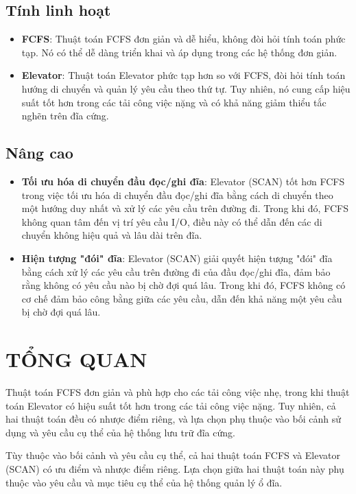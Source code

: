 \documentclass{report}
\begin{document}
        \subsection{Tính linh hoạt}
            \begin{itemize}
                \item \textbf{FCFS}: Thuật toán FCFS đơn giản và dễ hiểu, không đòi hỏi tính toán phức tạp. Nó có thể dễ dàng triển khai và áp dụng trong các hệ thống đơn giản.

                \item \textbf{Elevator}: Thuật toán Elevator phức tạp hơn so với FCFS, đòi hỏi tính toán hướng di chuyển và quản lý yêu cầu theo thứ tự. Tuy nhiên, nó cung cấp hiệu suất tốt hơn trong các tải công việc nặng và có khả năng giảm thiểu tắc nghẽn trên đĩa cứng.

            \end{itemize}

        \subsection{Nâng cao}
            \begin{itemize}
                \item \textbf{Tối ưu hóa di chuyển đầu đọc/ghi đĩa}: Elevator (SCAN) tốt hơn FCFS trong việc tối ưu hóa di chuyển đầu đọc/ghi đĩa bằng cách di chuyển theo một hướng duy nhất và xử lý các yêu cầu trên đường đi. Trong khi đó, FCFS không quan tâm đến vị trí yêu cầu I/O, điều này có thể dẫn đến các di chuyển không hiệu quả và lâu dài trên đĩa.

                \item \textbf{Hiện tượng "đói" đĩa}: Elevator (SCAN) giải quyết hiện tượng "đói" đĩa bằng cách xử lý các yêu cầu trên đường đi của đầu đọc/ghi đĩa, đảm bảo rằng không có yêu cầu nào bị chờ đợi quá lâu. Trong khi đó, FCFS không có cơ chế đảm bảo công bằng giữa các yêu cầu, dẫn đến khả năng một yêu cầu bị chờ đợi quá lâu.
            \end{itemize}

        
    \section{TỔNG QUAN} 
    
    Thuật toán FCFS đơn giản và phù hợp cho các tải công việc nhẹ, trong khi thuật toán Elevator có hiệu suất tốt hơn trong các tải công việc nặng. Tuy nhiên, cả hai thuật toán đều có nhược điểm riêng, và lựa chọn phụ thuộc vào bối cảnh sử dụng và yêu cầu cụ thể của hệ thống lưu trữ đĩa cứng.

    Tùy thuộc vào bối cảnh và yêu cầu cụ thể, cả hai thuật toán FCFS và Elevator (SCAN) có ưu điểm và nhược điểm riêng. Lựa chọn giữa hai thuật toán này phụ thuộc vào yêu cầu và mục tiêu cụ thể của hệ thống quản lý ổ đĩa.
\end{document}

